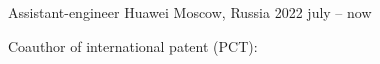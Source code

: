 
\begin{cventries}

  \cventry
    {Assistant-engineer} {Huawei}
    {Moscow, Russia} {2022 july -- now}
    {
      \begin{cvitems} %
        \item Coauthor of international patent (PCT):
        \item 
      \end{cvitems}
    }

\end{cventries}
